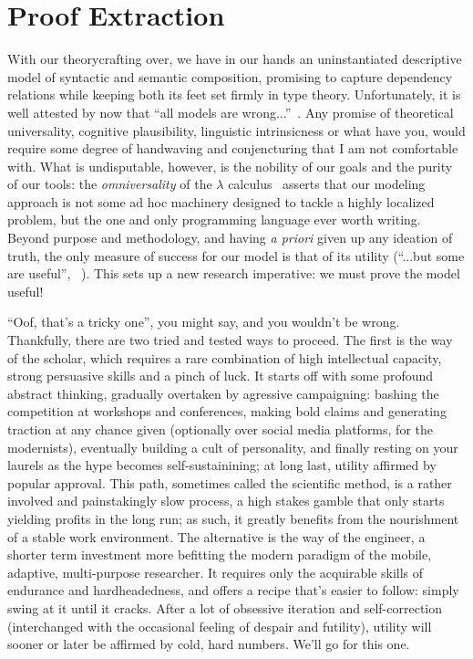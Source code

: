 \chapter{Proof Extraction}
\label{chapter:chapter_3}


With our theorycrafting over, we have in our hands an uninstantiated descriptive model of syntactic and semantic composition, promising to capture dependency relations while keeping both its feet set firmly in type theory.
Unfortunately, it is well attested by now that ``all models are wrong...''~\cite{doi:10.1080/01621459.1976.10480949}.
Any promise of theoretical universality, cognitive plausibility, linguistic intrinsicness or what have you, would require some degree of handwaving and conjencturing that I am not comfortable with.
What is undisputable, however, is the nobility of our goals and the purity of our tools: the \textit{omniversality} of the $\lambda$ calculus~\cite{wadler2015propositions} asserts that our modeling approach is not some ad hoc machinery designed to tackle a highly localized problem, but the one and only programming language ever worth writing. 
Beyond purpose and methodology, and having \textit{a priori} given up any ideation of truth, the only measure of success for our model is that of its utility (``...but some are useful'', ~\cite{doi:10.1080/01621459.1976.10480949}).
This sets up a new research imperative: we must prove the model useful!

``Oof, that's a tricky one'', you might say, and you wouldn't be wrong.
Thankfully, there are two tried and tested ways to proceed.
The first is the way of the scholar, which requires a rare combination of high intellectual capacity, strong persuasive skills and a pinch of luck.
It starts off with some profound abstract thinking, gradually overtaken by agressive campaigning: bashing the competition at workshops and conferences, making bold claims and generating traction at any chance given (optionally over social media platforms, for the modernists), eventually building a cult of personality, and finally resting on your laurels as the hype becomes self-sustainining; at long last, utility affirmed by popular approval.
This path, sometimes called the scientific method, is a rather involved and painstakingly slow process, a high stakes gamble that only starts yielding profits in the long run; as such, it greatly benefits from the nourishment of a stable work environment.
The alternative is the way of the engineer, a shorter term investment more befitting the modern paradigm of the mobile, adaptive, multi-purpose researcher.
It requires only the acquirable skills of endurance and hardheadedness, and offers a recipe that's easier to follow: simply swing at it until it cracks.
After a lot of obsessive iteration and self-correction (interchanged with the occasional feeling of despair and futility), utility will sooner or later be affirmed by cold, hard numbers.
We'll go for this one.

